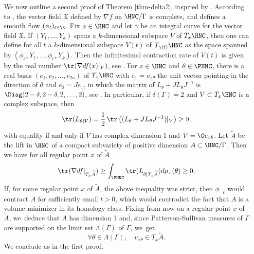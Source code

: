 \begin{remark}
We now outline a second proof of Theorem \ref{thm-delta2}, inspired by \cite[Th.\,1.5]{connellNaturalFlowCritical2023}. According to \cite[Lem.\,2.2]{connellNaturalFlowCritical2023}, the vector field $\mathfrak{X}$ defined by $\nabla{f}$ on $\HNC/\Gamma$ is complete, and defines a smooth flow $(\phi_t)_{t\in \R}$. Fix $x\in \HNC$ and let $\gamma$ be an integral curve for the vector field $\mathfrak{X}$. If $(Y_1,\dots,Y_k)$ spans a $k$-dimensional subspace $V$ of $T_x\HNC$, then one can define for all $t$ a $k$-dimensional subspace $V(t)$ of $T_{\gamma(t)}\HNC$ as the space spanned by $(\phi_{t\ast}Y_1,\dots,\phi_{t\ast}Y_k)$. Then the infinitesimal contraction rate of $V(t)$ is given by the real number $\tr(\nabla d{f}(x)\vert_{ V})$, see \cite[Lem.\,2.5]{connellNaturalFlowCritical2023}. For $x\in \HNC$ and $\theta\in \PHNC$, there is a real basis $(e_1,e_2,\dots,e_{2n})$ of $T_{x}\HNC$ with $e_1=v_{x\theta}$ the unit vector pointing in the direction of $\theta$ and $e_2=Je_1$, in which the matrix of $L_{\theta} + JL_{\theta}J^{-1}$ is
$\Diag(2-\delta,2-\delta,2,\dots,2)$, see \cite[Proof of Lem.\,2.6]{connellNaturalFlowCritical2023}.
In particular, if $\delta(\Gamma)=2$ and $V\subset T_x\HNC$ is a complex subspace, then
\begin{equation*}
\tr(L_{\theta\vert V}) = \frac{1}{2}\,\tr\left((L_{\theta} + JL_{\theta}J^{-1})\vert_{ V}\right) \ge 0,
\end{equation*}
with equality if and only if $V$ has complex dimension 1 and $V=\C v_{x\theta}$.
Let $\widetilde{A}$ be the lift in $\HNC$ of a compact subvariety of positive dimension $A\subset\HNC/\Gamma$. Then we have for all regular point $x$ of $\widetilde{A}$
\begin{equation*}
\tr(\nabla d{f}\vert_{ T_x\widetilde{A}}) \ge \int_{\PHNC}\tr(L_{\theta\vert T_x\widetilde{A}})d\mu_x(\theta) \ge 0.
\end{equation*}
If, for some regular point $x$ of $\widetilde{A}$, the above inequality was strict, then $\phi_{-t}$ would contract $A$ for sufficiently small $t>0$, which would contradict the fact that $A$ is a volume minimizer in its homology class. Fixing from now on a regular point $x$ of $\widetilde{A}$, we~deduce that $A$ has dimension 1 and, since Patterson-Sullivan measures of $\Gamma$ are supported on the limit set $\Lambda(\Gamma)$ of $\Gamma$, we~get
\begin{equation*}
\forall \theta \in \Lambda(\Gamma),\quad v_{x\theta} \in T_x\widetilde{A}.
\end{equation*}
We conclude as in the first proof.
\end{remark}
